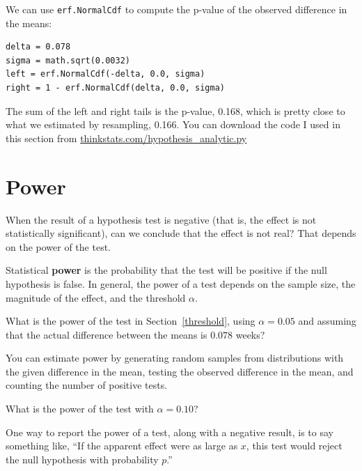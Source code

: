\documentclass[12pt]{book}
\begin{document}

We can use {\tt erf.NormalCdf} to compute the p-value of the observed 
difference in the means:

\begin{verbatim}
delta = 0.078
sigma = math.sqrt(0.0032)
left = erf.NormalCdf(-delta, 0.0, sigma)
right = 1 - erf.NormalCdf(delta, 0.0, sigma)
\end{verbatim}

The sum of the left and right tails is the p-value, 0.168, which is
pretty close to what we estimated by resampling, 0.166. 
You can download the code I used in this section from
\url{thinkstats.com/hypothesis_analytic.py}



\section{Power}

When the result of a hypothesis test is negative (that is, the effect is
not statistically significant), can we conclude that the effect is not
real?  That depends on the power of the test.

Statistical {\bf power} is the probability that the test will be
positive if the null hypothesis is false.  In general, the power of a
test depends on the sample size, the magnitude of the effect, and the
threshold $\alpha$.

\begin{exercise}
What is the power of the test in Section~\ref{threshold}, using
$\alpha=0.05$ and assuming that the actual difference between the
means is $0.078$ weeks?

You can estimate power by generating random samples from distributions
with the given difference in the mean, testing the observed difference
in the mean, and counting the number of positive tests.

What is the power of the test with $\alpha=0.10$?

\end{exercise}

One way to report the power of a test, along with a negative result,
is to say something like, ``If the apparent effect were as large
as $x$, this test would reject the null hypothesis with probability $p$.''


\end{document}
